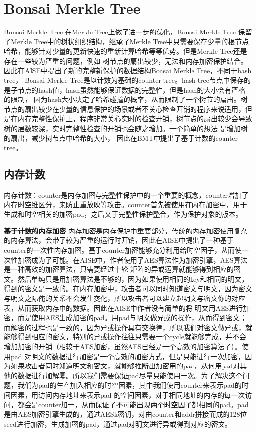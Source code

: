 \section{Bonsai Merkle Tree}
Bonsai Merkle Tree \cite{rogers2007using}在Merkle Tree上做了进一步的优化，Bonsai Merkle Tree 保留了Merkle Tree中的树状组织结构，继承了Merkle Tree中只需要保存少量的根节点哈希，能够针对少量的更新快速的重新计算哈希等等优势。但是Merkle Tree还是存在一些较为严重的问题，例如
树节点的扇出较少，无法和内存加密保护结合。因此在AISE中提出了新的完整新保护的数据结构Bonsai Merkle Tree，不同于hash tree， Bonsai Merkle Tree是以计数为基础的counter tree。hash tree节点中保存的是子节点的hash值，hash虽然能够保证数据的完整性，但是hash的大小会有严格的限制，
因为hash大小决定了哈希碰撞的概率，从而限制了一个树节的扇出。树节点的扇出较少在少量的信息保护的场景或者不关心检查开销的程序来说适用，但是在内存完整性保护上，程序非常关心实时的检查开销，树节点的扇出较少会导致树的层数较深，实时完整性检查的开销也会随之增加。一个简单的想法
是增加树的扇出，减少树节点中哈希的大小， 因此在BMT中提出了基于计数的counter tree。

\subsection{内存计数}
内存计数：counter是内存加密与完整性保护中的一个重要的概念，counter增加了内存时空维区分，来防止重放映等攻击。counter首先被使用在内存加密中，用于生成和时空相关的加密pad，之后又于完整性保护整合，作为保护对象的版本。

\textbf{基于计数的内存加密}
内存加密是内存保护中重要部分，传统的内存加密使用复杂的内存算法，会带了较为严重的运行时开销，因此在AISE中提出了一种基于counter的一次性内存加密。基于counter加密能够充分利用给时空因子，从而使一次性加密成为了可能。在AISE中，作者使用了AES算法作为加密引擎，AES算法是一种高效的加密算法，只需要经过十轮
矩阵的异或运算就能够得到相应的密文。然后单纯只是用加密算法是不够的，因为如果使用相同的key和相同的明文，得到的密文是一致的。在内存加密中，攻击者可以同时知道密文与明文，因为密文与明文之际俺的关系不会发生变化，所以攻击者可以建立起明文与密文你的对应表，从而获取内存中的数据。因此在AISE中作者没有简单的将
明文用AES进行加密，而是使用AES生成加密的pad。用pad与明文做异或的操作，从而得到密文；而解密的过程也是一致的，因为异或操作具有交换律，所以我们对密文做异或，就能够得到相应的密文，特别的异或操作往往只需要一个cycle就能够完成，并不会增加加密的开销（相较于AES加密，虽然AES已经是一个高效的加密算法了）。使用pad
对明文的数据进行加密是一个高效的加密方式，但是只能进行一次加密，因为如果攻击者同时知道明文和密文，就能够推断出加密用的pad，从何用pad对其他的数据进行加解幂。所以我们需要保证pad尽量只能使用一次。为了解决这个问题，我们为pad的生产加入相应的时空因素，其中我们使用counter来表示pad的时间因素，用访问内存地址来表示pad
的空间因素，对于相同地址的内存的每一次访问，都会是counter加一，从而保证了不可能出现两个时空因子都相同的pad。pad是由AES加密引擎生成的，通过AESk密钥，对由counter和addr拼接而成的128位seed进行加密，生成加密的pad，通过pad对明文进行异或得到对应的密文。

